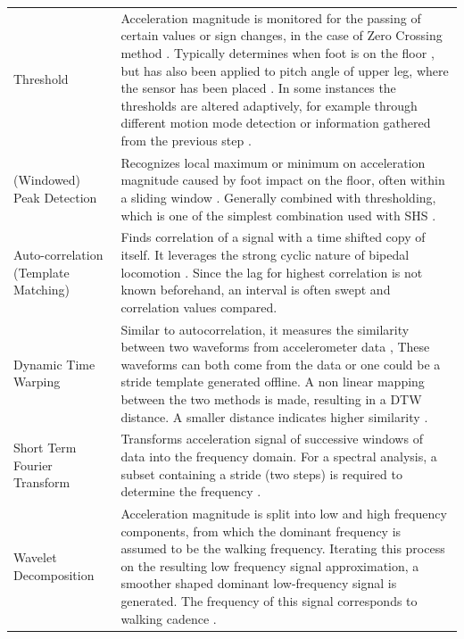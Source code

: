 	\begin{table}[h]
		\centering
		\footnotesize
		\begin{tabularx}{\linewidth}{@{} P{17mm} L}
			\toprule
				&   	\\
			\midrule			
			Threshold & Acceleration magnitude is monitored for the passing of certain values or sign changes, in the case of Zero Crossing method \cite{Davidson2017,Harle2013}. Typically determines when foot is on the floor \cite{Harle2013}, but has also been applied to pitch angle of upper leg, where the sensor has been placed \cite{Diaz2014a}. In some instances the thresholds are altered adaptively, for example through different motion mode detection or information gathered from the previous step \cite{Wu2019}.\\ 
  (Windowed) Peak Detection & Recognizes local maximum or minimum on acceleration magnitude caused by foot impact on the floor, often within a sliding window \cite{Susi2013}. Generally combined with thresholding, which is one of the simplest combination used with \ac{SHS} \cite{Davidson2017}. \\ \hline
  Auto-correlation (Template Matching) &  Finds correlation of a signal with a time shifted copy of itself. It leverages the strong cyclic nature of bipedal locomotion \cite{Harle2013}. Since the lag for highest correlation is not known beforehand, an interval is often swept and correlation values compared. \\ \hline
  Dynamic Time Warping & Similar to autocorrelation, it measures the similarity between two waveforms from accelerometer data \cite{Davidson2017}, These waveforms can both come from the data or one could be a stride template generated offline. A non linear mapping between the two methods is made, resulting in a DTW distance. A smaller distance indicates higher similarity \cite{Davidson2017}.  \\ \hline
  Short Term Fourier Transform & Transforms acceleration signal  of successive windows of data into the frequency domain. For a spectral analysis, a subset containing a stride (two steps) is required to determine the frequency \cite{Harle2013}.  \\ \hline
  Wavelet Decomposition & Acceleration magnitude is split into low and high frequency components, from which the dominant frequency is assumed to be the walking frequency. Iterating this process on the resulting low frequency signal approximation, a smoother shaped dominant low-frequency signal is generated. The frequency of this signal corresponds to walking cadence \cite{Davidson2017}. \\ \hline	

\end{tabularx}
\end{table}
